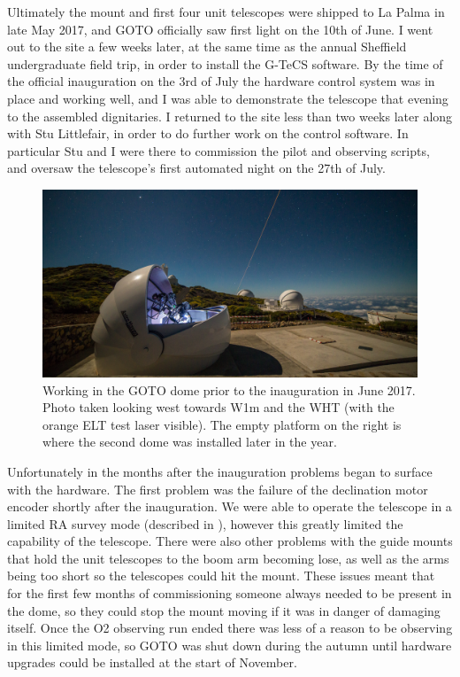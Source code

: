 \begin{colsection}
\begin{colsection}
Ultimately the mount and first four unit telescopes were shipped to La Palma in late May 2017, and GOTO officially saw first light on the 10th of June. I went out to the site a few weeks later, at the same time as the annual Sheffield undergraduate field trip, in order to install the G-TeCS software. By the time of the official inauguration on the 3rd of July the hardware control system was in place and working well, and I was able to demonstrate the telescope that evening to the assembled dignitaries. I returned to the site less than two weeks later along with Stu Littlefair, in order to do further work on the control software. In particular Stu and I were there to commission the pilot and observing scripts, and oversaw the telescope's first automated night on the 27th of July.

\begin{figure}[t]
    \begin{center}
        \includegraphics[width=\textwidth]{images/inauguration_photo.jpg}
    \end{center}
    \caption[Working in the GOTO dome prior to the inauguration in June 2017]{
        Working in the GOTO dome prior to the inauguration in June 2017. Photo taken looking west towards W1m and the WHT (with the orange ELT test laser visible). The empty platform on the right is where the second dome was installed later in the year.
    }\label{fig:inauguration}
\end{figure}

Unfortunately in the months after the inauguration problems began to surface with the hardware. The first problem was the failure of the declination motor encoder shortly after the inauguration. We were able to operate the telescope in a limited RA survey mode (described in ), however this greatly limited the capability of the telescope. There were also other problems with the guide mounts that hold the unit telescopes to the boom arm becoming lose, as well as the arms being too short so the telescopes could hit the mount. These issues meant that for the first few months of commissioning someone always needed to be present in the dome, so they could stop the mount moving if it was in danger of damaging itself. Once the O2 observing run ended there was less of a reason to be observing in this limited mode, so GOTO was shut down during the autumn until hardware upgrades could be installed at the start of November.


\end{colsection}
\end{colsection}
